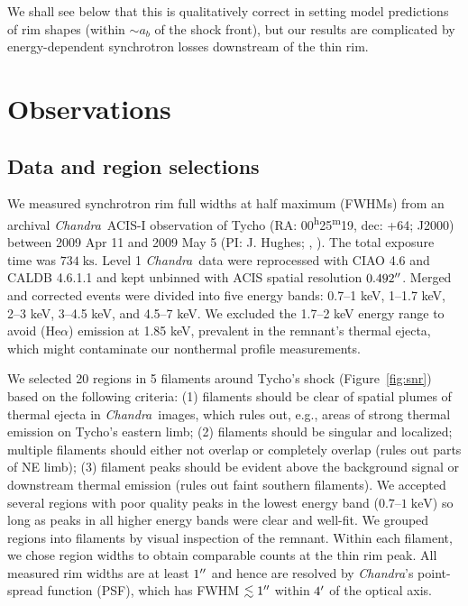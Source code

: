 \documentclass[iop, apj, numberedappendix]{emulateapj}
\newcommand*{\mt}{\mathrm}
\newcommand*{\unit}[1]{\;\mt{#1}}  %
\newcommand*{\abt}{\mathord{\sim}} %
\newcommand*{\tsup}{\textsuperscript}
\newcommand*{\Chandra}{\textit{Chandra}\ }
\begin{document}
We shall see below that this is qualitatively correct in setting model
predictions of rim shapes (within $\abt a_b$ of the shock front), but our
results are complicated by energy-dependent synchrotron losses downstream of
the thin rim.


\section{Observations}
\label{sec:observations}

\subsection{Data and region selections}
\label{sec:regions}

We measured synchrotron rim full widths at half maximum (FWHMs) from an
archival \Chandra ACIS-I observation of Tycho
(RA: 00\tsup{h}25\tsup{m}19, dec: +64; J2000)
between 2009 Apr 11 and 2009 May 5 (PI: J. Hughes;
,
).
The total exposure time was $734 \unit{ks}$.
Level 1 \Chandra data were reprocessed with CIAO 4.6 and CALDB 4.6.1.1 and kept
unbinned with ACIS spatial resolution $0.492\mbox{$^{\prime\prime}$}$.
Merged and corrected events were divided into five energy bands:
0.7--1 keV, 1--1.7 keV, 2--3 keV, 3--4.5 keV, and 4.5--7 keV.
We excluded the 1.7--2 keV energy range to avoid  (He$\alpha$)
emission at 1.85 keV, prevalent in the remnant's thermal ejecta, which
might contaminate our nonthermal profile measurements.

We selected 20 regions in 5 filaments around Tycho's shock
(Figure~\ref{fig:snr}) based on the following criteria: (1) filaments should be
clear of spatial plumes of thermal ejecta in \Chandra images, which rules out,
e.g., areas of strong thermal emission on Tycho's eastern limb; (2) filaments
should be singular and localized; multiple filaments should either not
overlap or completely overlap (rules out parts of NE limb); (3) filament
peaks should be evident above the background signal or downstream thermal
emission (rules out faint southern filaments).  We accepted several
regions with poor quality peaks in the lowest energy band ($0.7$--$1
\unit{keV}$) so long as peaks in all higher energy bands were clear and
well-fit.  We grouped regions into filaments by visual inspection of the
remnant.  Within each filament, we chose region widths to obtain comparable
counts at the thin rim peak.  All measured rim widths are at least $1\mbox{$^{\prime\prime}$}$
and hence are resolved by \textit{Chandra}'s point-spread function (PSF), which
has FWHM $\lesssim 1\mbox{$^{\prime\prime}$}$ within $4\mbox{$^\prime$}$ of the optical axis.
\end{document}
